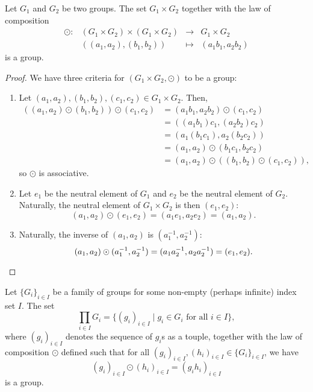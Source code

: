 \begin{prop}\label{prop:direct_product}
Let $ G_1 $ and $ G_2 $ be two groups. The set $ G_1\times G_2 $ together with the law of composition
\begin{equation*}
    \begin{array}{rccc}
        \odot: & (G_1\times G_2)\times(G_1\times G_2) & \to & G_1\times G_2 \\
        & ((a_1,a_2),(b_1,b_2)) & \mapsto & (a_1b_1,a_2b_2)
    \end{array}
\end{equation*}
is a group.
\end{prop}
\begin{proof}
We have three criteria for $ (G_1\times G_2,\odot) $ to be a group:
\begin{enumerate}
    \item Let $ (a_1,a_2),(b_1,b_2),(c_1,c_2)\in G_1\times G_2 $. Then,
    \begin{align*}
        ((a_1,a_2)\odot(b_1,b_2))\odot(c_1,c_2) &= (a_1b_1,a_2b_2)\odot(c_1,c_2) \\
        &= ((a_1b_1)c_1,(a_2b_2)c_2) \\
        &= (a_1(b_1c_1),a_2(b_2c_2)) \\
        &= (a_1,a_2)\odot(b_1c_1,b_2c_2) \\
        &= (a_1,a_2)\odot((b_1,b_2)\odot(c_1,c_2)),
    \end{align*}
    so $ \odot $ is associative.
    \item Let $ e_1 $ be the neutral element of $ G_1 $ and $ e_2 $ be the neutral element of $ G_2 $. Naturally, the neutral element of $ G_1\times G_2 $ is then $ (e_1,e_2) $:
    \begin{equation*}
        (a_1,a_2)\odot(e_1,e_2)=(a_1e_1,a_2e_2)=(a_1,a_2).
    \end{equation*}
    \item Naturally, the inverse of $ (a_1,a_2) $ is $ (a_1^{-1},a_2^{-1}) $:
    \begin{equation*}
        (a_1,a_2)\odot(a_1^{-1},a_2^{-1})=(a_1a_2^{-1},a_2a_2^{-1})=(e_1,e_2).\qedhere
    \end{equation*}
\end{enumerate}
\end{proof}

\begin{cor}\label{cor:direct_product}
Let $ \{G_i\}_{i\in I} $ be a family of groups for some non-empty (perhaps infinite) index set $ I $. The set
\begin{equation*}
    \prod_{i\in I}G_i=\{(g_i)_{i\in I}\mid g_i\in G_i\text{ for all }i\in I\},
\end{equation*}
where $ (g_i)_{i\in I} $ denotes the sequence of $ g_i $s as a touple, together with the law of composition $ \odot $ defined such that for all $ (g_i)_{i\in I},(h_i)_{i\in I}\in\{G_i\}_{i\in I} $, we have
\begin{equation*}
    (g_i)_{i\in I}\odot(h_i)_{i\in I}=(g_ih_i)_{i\in I}
\end{equation*}
is a group.
\end{cor}

